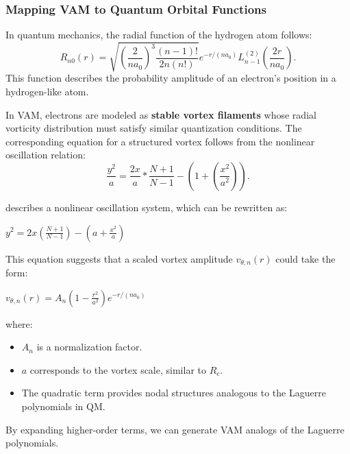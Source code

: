 \documentclass[a4paper,10pt]{article}
\begin{document}
\subsubsection{Mapping VAM to Quantum Orbital Functions}

In quantum mechanics, the radial function of the hydrogen atom follows:
\begin{equation*}
    R_{n0}(r) = \sqrt{\left(\frac{2}{n a_0}\right)^3 \frac{(n-1)!}{2n(n!)}} e^{-r / (n a_0)} L_{n-1}^{(2)}\left(\frac{2r}{n a_0}\right).
\end{equation*}
This function describes the probability amplitude of an electron's position in a hydrogen-like atom.

In VAM, electrons are modeled as \textbf{stable vortex filaments} whose radial vorticity distribution must satisfy similar quantization conditions. The corresponding equation for a structured vortex follows from the nonlinear oscillation relation:
\begin{equation*}
    \frac{y^2}{a} = \frac{2 x}{a} * \frac{N + 1}{N - 1} - \left(1 + \left(\frac{x^2}{a^2}\right)\right).
\end{equation*}


describes a nonlinear oscillation system, which can be rewritten as:

$y^2 = 2x \left(\frac{N+1}{N-1}\right) - \left(a + \frac{x^2}{a}\right)$

This equation suggests that a scaled vortex amplitude $v_{\theta, n}(r)$ could take the form:

$v_{\theta, n}(r) = A_n \left(1 - \frac{r^2}{a^2}\right) e^{-r / (n a_0)}$

where:

\begin{itemize}
\item $A_n$ is a normalization factor.
\item $a$ corresponds to the vortex scale, similar to $R_c$.
\item The quadratic term provides nodal structures analogous to the Laguerre polynomials in QM.
\end{itemize}
By expanding higher-order terms, we can generate VAM analogs of the Laguerre polynomials.
\end{document}
